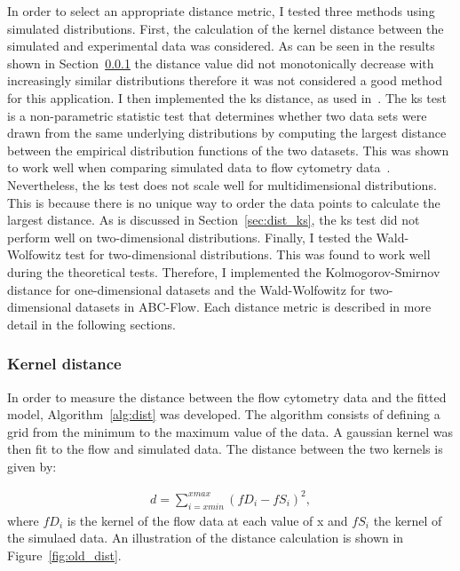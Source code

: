 In order to select an appropriate distance metric, I tested three methods using simulated distributions. First, the calculation of the kernel distance between the simulated and experimental data was considered. As can be seen in the results shown in Section~\ref{sec:dist_kernel} the distance value did not monotonically decrease with increasingly similar distributions therefore it was not considered a good method for this application. I then implemented the \acrfull{ks} distance, as used in~\textcite{Lillacci:2013hu}. The \acrshort{ks} test is a non-parametric statistic test that determines whether two data sets were drawn from the same underlying distributions by computing the largest distance between the empirical distribution functions of the two datasets. This was shown to work well when  comparing simulated data to flow cytometry data~\autocite{Lillacci:2013hu}. Nevertheless, the \acrshort{ks} test does not scale well for multidimensional distributions. This is because there is no unique way to order the data points to calculate the largest distance. As is discussed in Section~\ref{sec:dist_ks}, the \acrshort{ks} test did not perform well on two-dimensional distributions. Finally, I tested the Wald-Wolfowitz test for two-dimensional distributions. This was found to work well during the theoretical tests. Therefore, I implemented the Kolmogorov-Smirnov distance for one-dimensional datasets and the Wald-Wolfowitz for two-dimensional datasets in ABC-Flow. Each distance metric is described in more detail in the following sections.  

\label{sec:dist}
\subsubsection{Kernel distance}
\label{sec:dist_kernel}
In order to measure the distance between the flow cytometry data and the fitted model, Algorithm~\ref{alg:dist} was developed. The algorithm consists of defining a grid from the minimum to the maximum value of the data. A gaussian kernel was then fit to the flow and simulated data. The distance between the two kernels is given by:

\begin{align*}%
	d = \sum_{i=xmin}^{xmax} (fD_i - fS_i)^2,
\end{align*}
where $fD_i$ is the kernel of the flow data at each value of x and $fS_i$ the kernel of the simulaed data. An illustration of the distance calculation is shown in Figure~\ref{fig:old_dist}.



